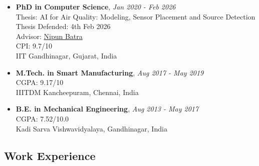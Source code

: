 \documentclass[letter,10pt]{article}
\begin{document}
\begin{itemize}
\item
    \textbf{PhD in Computer Science}, \hfill \textit{Jan 2020 - Feb 2026}\\
    Thesis: AI for Air Quality: Modeling, Sensor Placement and Source Detection\\
    Thesis Defended: 4th Feb 2026\\
	Advisor: \href{https://nipunbatra.github.io/}{Nipun Batra} \\
	CPI: 9.7/10\\
	IIT Gandhinagar, Gujarat, India
\item
	\textbf{M.Tech. in Smart Manufacturing}, \hfill \textit{Aug 2017 - May 2019}\\
	CGPA: 9.17/10\\
	IIITDM Kancheepuram, Chennai, India
\item
	\textbf{B.E. in Mechanical Engineering}, \hfill \textit{Aug 2013 - May 2017}\\
	CGPA: 7.52/10.0\\
	Kadi Sarva Vishwavidyalaya, Gandhinagar, India

\end{itemize}

\subsection*{{\sc \textbf{Work Experience}}\hspace{5pt}\noindent\hrulefill}
\end{document}
